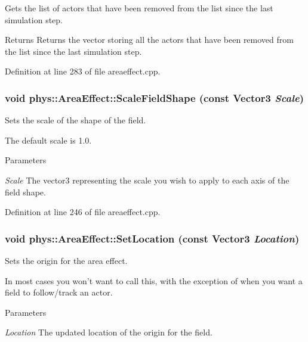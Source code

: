 Gets the list of actors that have been removed from the list since the last simulation step. 

\begin{DoxyReturn}{Returns}
Returns the vector storing all the actors that have been removed from the list since the last simulation step. 
\end{DoxyReturn}


Definition at line 283 of file areaeffect.cpp.

\hypertarget{classphys_1_1AreaEffect_a9407bf7416a804757d52127a3efae747}{
\subsubsection[{ScaleFieldShape}]{\setlength{\rightskip}{0pt plus 5cm}void phys::AreaEffect::ScaleFieldShape (const {\bf Vector3} {\em Scale})}}
\label{d4/d55/classphys_1_1AreaEffect_a9407bf7416a804757d52127a3efae747}


Sets the scale of the shape of the field. 

The default scale is 1.0. 
\begin{DoxyParams}{Parameters}
\item[{\em Scale}]The vector3 representing the scale you wish to apply to each axis of the field shape. \end{DoxyParams}


Definition at line 246 of file areaeffect.cpp.

\hypertarget{classphys_1_1AreaEffect_a9332d4f1c5d1eaa23c6db5e9b95d746e}{
\subsubsection[{SetLocation}]{\setlength{\rightskip}{0pt plus 5cm}void phys::AreaEffect::SetLocation (const {\bf Vector3} {\em Location})}}
\label{d4/d55/classphys_1_1AreaEffect_a9332d4f1c5d1eaa23c6db5e9b95d746e}


Sets the origin for the area effect. 

In most cases you won't want to call this, with the exception of when you want a field to follow/track an actor. 
\begin{DoxyParams}{Parameters}
\item[{\em Location}]The updated location of the origin for the field. \end{DoxyParams}



